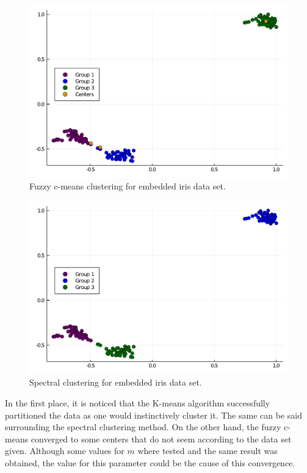 \documentclass[conference]{IEEEtran}
\theoremstyle{definition}
\theoremstyle{remark}
\theoremstyle{remark}
\begin{document}
\begin{figure}[t]
  \centering
  \includegraphics[scale=.35]{figs/iris/emb-fc-means}
  \caption{Fuzzy c-means clustering for embedded iris data set.}
  \label{fig:embfc}
\end{figure}

\begin{figure}[t]
  \centering
  \includegraphics[scale=.35]{figs/iris/emb-spectral-clustering}
  \caption{Spectral clustering for embedded iris data set.}
  \label{fig:embsc}
\end{figure}

In the first place, it is noticed that the K-means algorithm successfully
partitioned the data as one would instinctively cluster it. The same can be said
surrounding the spectral clustering method. On the other hand, the fuzzy c-means
converged to some centers that do not seem according to the data set given.
Although some values for $m$ where tested and the same result was obtained, the
value for this parameter could be the cause of this convergence.
\end{document}
